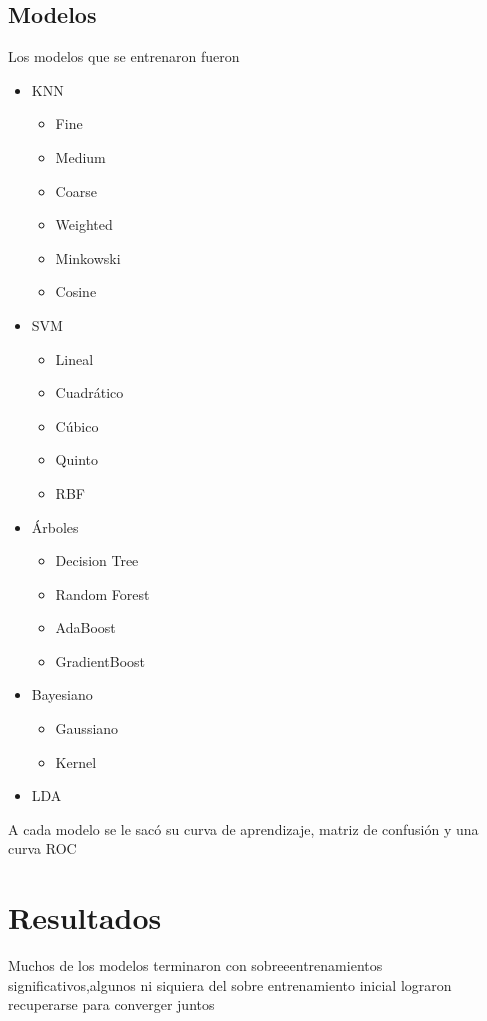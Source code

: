 \documentclass[12pt,a4paper]{report}
\begin{document}
\section{Modelos}
Los modelos que se entrenaron fueron 
\begin{itemize}
    \item KNN
    \begin{itemize}
        \item Fine
        \item Medium
        \item Coarse
        \item Weighted
        \item Minkowski
        \item Cosine
    \end{itemize}

    \item SVM
    \begin{itemize}
        \item Lineal
        \item Cuadrático
        \item Cúbico
        \item Quinto
        \item RBF
    \end{itemize}

    \item Árboles
    \begin{itemize}
        \item Decision Tree
        \item Random Forest
        \item AdaBoost
        \item GradientBoost
    \end{itemize}

    \item Bayesiano
    \begin{itemize}
        \item Gaussiano
        \item Kernel
    \end{itemize}

    \item LDA
\end{itemize}
A cada modelo se le sacó su curva de aprendizaje, matriz de confusión y una curva ROC 
\chapter{Resultados}
Muchos de los modelos terminaron con sobreeentrenamientos significativos,algunos ni siquiera del sobre entrenamiento inicial lograron recuperarse para converger juntos
\end{document}
